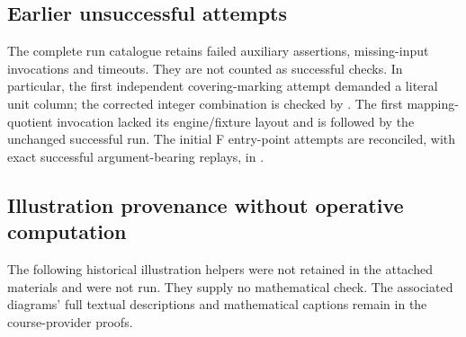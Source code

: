 \subsection{Earlier unsuccessful attempts}
The complete run catalogue retains failed auxiliary assertions, missing-input
invocations and timeouts. They are not counted as successful checks. In
particular, the first independent covering-marking attempt demanded a
literal unit column; the corrected integer combination is checked by
. The first mapping-quotient invocation
lacked its engine/fixture layout and is followed by the unchanged successful
run. The initial F entry-point attempts are reconciled, with exact successful
argument-bearing replays, in
.

\subsection{Illustration provenance without operative computation}
The following historical illustration helpers were not retained in the
attached materials and were not run. They supply no mathematical check.
The associated diagrams' full textual descriptions and mathematical
captions remain in the course-provider proofs.











